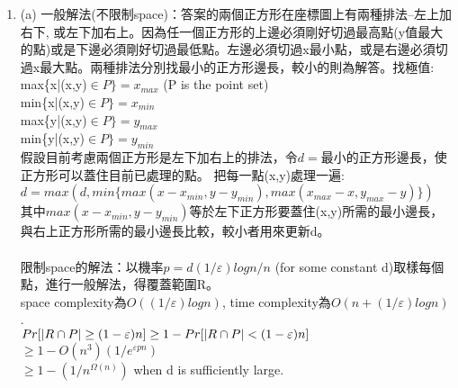 \documentclass[11pt]{article}
\begin{document}
\begin{enumerate}
\item (a)
一般解法(不限制space)：答案的兩個正方形在座標圖上有兩種排法--左上加右下, 或左下加右上。因為任一個正方形的上邊必須剛好切過最高點(y值最大的點)或是下邊必須剛好切過最低點。左邊必須切過x最小點，或是右邊必須切過x最大點。兩種排法分別找最小的正方形邊長，較小的則為解答。找極值:\\
max\{x|(x,y)$\in P\}=x_{max}$ (P is the point set)\\
min\{x|(x,y)$\in P\}=x_{min}$\\
max\{y|(x,y)$\in P\}=y_{max}$\\
min\{y|(x,y)$\in P\}=y_{min}$\\
假設目前考慮兩個正方形是左下加右上的排法，令$d=$最小的正方形邊長，使正方形可以蓋住目前已處理的點。
把每一點(x,y)處理一遍:\\
$d=max(d,min\{max(x-x_{min},y-y_{min}),max(x_{max}-x,y_{max}-y)\})$\\
其中$max(x-x_{min},y-y_{min})$等於左下正方形要蓋住(x,y)所需的最小邊長，與右上正方形所需的最小邊長比較，較小者用來更新d。\\
\\
限制space的解法：以機率$p=d(1/\varepsilon)logn/n$ (for some constant d)取樣每個點，進行一般解法，得覆蓋範圍R。\\
space complexity為$O((1/\varepsilon)logn)$, time complexity為$O(n+(1/\varepsilon)logn)$.\\
$Pr[|R\cap P|\geq(1-\varepsilon)n]\\
\geq 1-Pr[|R\cap P|<(1-\varepsilon)n]$\\
$\geq 1-O(n^3)(1/e^{\varepsilon p n})$\\
$\geq 1-(1/n^{\Omega (n)})$ when d is sufficiently large.\\









\end{enumerate} 
\end{document}
